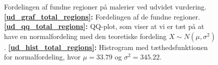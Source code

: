 {\begin{figure}[!h]
{        \label{ud_hist_total_regions}
    }
    \caption[]{Fordelingen af fundne regioner på malerier ved udvidet
    vurdering.
    \textbf{\ref{ud_graf_total_regions}:} Fordelingen af de fundne
    regioner.
    \textbf{\ref{ud_qq_total_regions}:} QQ-plot, som viser at vi er tæt
    på at have en normalfordeling med den teoretiske fordeling $X \sim N(\mu,
    \sigma^2)$.
    \textbf{\ref{ud_hist_total_regions}:} Histrogram med
    tæthedsfunktionen for normalfordeling, hvor $\mu = 33.79$ og
    $\sigma^2 = 345.22$.
    }
    \label{ud_total_regions_plots}
\end{figure}

} %


